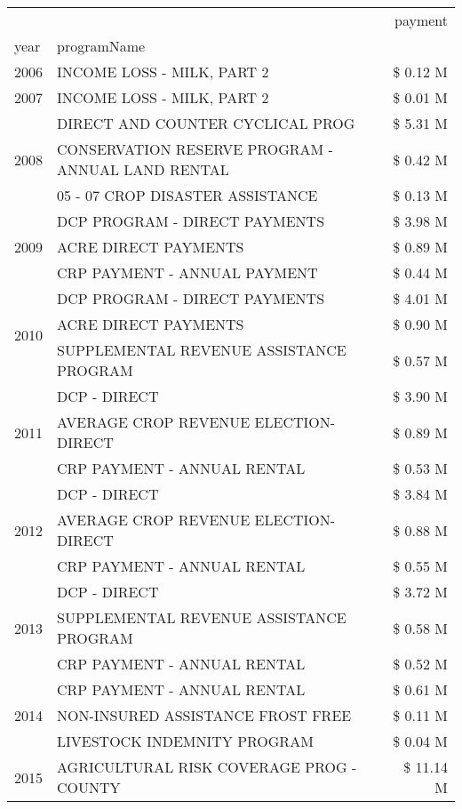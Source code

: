 \begin{tabular}{llr}
\toprule
 &  & payment \\
year & programName &  \\
\midrule
2006 & INCOME LOSS - MILK, PART 2 & \$ 0.12 M \\
\cline{1-3}
2007 & INCOME LOSS - MILK, PART 2 & \$ 0.01 M \\
\cline{1-3}
\multirow[t]{3}{*}{2008} & DIRECT AND COUNTER CYCLICAL PROG & \$ 5.31 M \\
 & CONSERVATION RESERVE PROGRAM - ANNUAL LAND RENTAL & \$ 0.42 M \\
 & 05 - 07 CROP DISASTER ASSISTANCE & \$ 0.13 M \\
\cline{1-3}
\multirow[t]{3}{*}{2009} & DCP PROGRAM - DIRECT PAYMENTS & \$ 3.98 M \\
 & ACRE DIRECT PAYMENTS & \$ 0.89 M \\
 & CRP PAYMENT - ANNUAL PAYMENT & \$ 0.44 M \\
\cline{1-3}
\multirow[t]{3}{*}{2010} & DCP PROGRAM - DIRECT PAYMENTS & \$ 4.01 M \\
 & ACRE DIRECT PAYMENTS & \$ 0.90 M \\
 & SUPPLEMENTAL REVENUE ASSISTANCE PROGRAM & \$ 0.57 M \\
\cline{1-3}
\multirow[t]{3}{*}{2011} & DCP - DIRECT & \$ 3.90 M \\
 & AVERAGE CROP REVENUE ELECTION-DIRECT & \$ 0.89 M \\
 & CRP PAYMENT - ANNUAL RENTAL & \$ 0.53 M \\
\cline{1-3}
\multirow[t]{3}{*}{2012} & DCP - DIRECT & \$ 3.84 M \\
 & AVERAGE CROP REVENUE ELECTION-DIRECT & \$ 0.88 M \\
 & CRP PAYMENT - ANNUAL RENTAL & \$ 0.55 M \\
\cline{1-3}
\multirow[t]{3}{*}{2013} & DCP - DIRECT & \$ 3.72 M \\
 & SUPPLEMENTAL REVENUE ASSISTANCE PROGRAM & \$ 0.58 M \\
 & CRP PAYMENT - ANNUAL RENTAL & \$ 0.52 M \\
\cline{1-3}
\multirow[t]{3}{*}{2014} & CRP PAYMENT - ANNUAL RENTAL & \$ 0.61 M \\
 & NON-INSURED ASSISTANCE FROST FREE & \$ 0.11 M \\
 & LIVESTOCK INDEMNITY PROGRAM & \$ 0.04 M \\
\cline{1-3}
\multirow[t]{3}{*}{2015} & AGRICULTURAL RISK COVERAGE PROG - COUNTY & \$ 11.14 M \\

\end{tabular}
